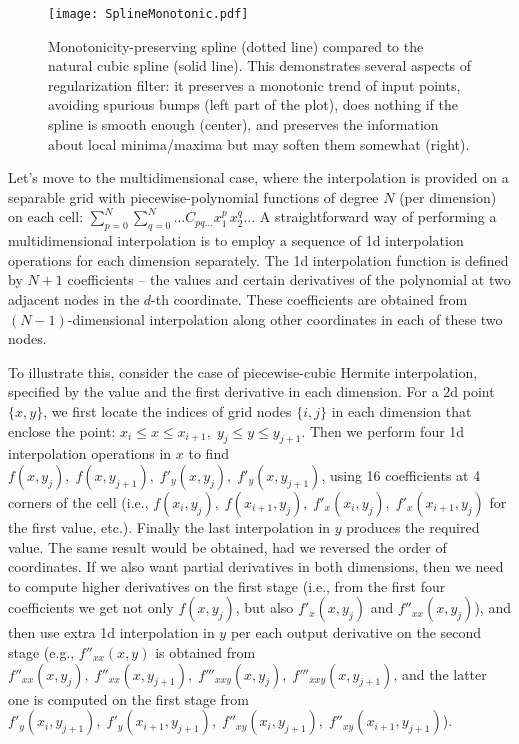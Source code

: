 \documentclass[12pt]{article}
\begin{document}
\begin{figure}[t]
\begin{center}
\texttt{[image: SplineMonotonic.pdf]}
\end{center}
\caption{Monotonicity-preserving spline (dotted line) compared to the natural cubic spline (solid line). This demonstrates several aspects of regularization filter: it preserves a monotonic trend of input points, avoiding spurious bumps (left part of the plot), does nothing if the spline is smooth enough (center), and preserves the information about local minima/maxima but may soften them somewhat (right). } \label{fig:SplineMonotonic}
\end{figure}

Let's move to the multidimensional case, where the interpolation is provided on a separable grid with piecewise-polynomial functions of degree $N$ (per dimension) on each cell: $\sum_{p=0}^{N}\sum_{q=0}^N\dots C_{pq\dots} x_1^p\,x_2^q\dots$
A straightforward way of performing a multidimensional interpolation is to employ a sequence of 1d interpolation operations for each dimension separately. The 1d interpolation function is defined by $N+1$ coefficients -- the values and certain derivatives of the polynomial at two adjacent nodes in the $d$-th coordinate. These coefficients are obtained from $(N-1)$-dimensional interpolation along other coordinates in each of these two nodes.

To illustrate this, consider the case of piecewise-cubic Hermite interpolation, specified by the value and the first derivative in each dimension. For a 2d point $\{x,y\}$, we first locate the indices of grid nodes $\{i,j\}$ in each dimension that enclose the point: $x_i\le x \le x_{i+1},\; y_j\le y \le y_{j+1}$. Then we perform four 1d interpolation operations in $x$ to find $f(x, y_j),\; f(x, y_{j+1}),\; f'_y(x, y_j),\; f'_y(x, y_{j+1})$, using 16 coefficients at 4 corners of the cell (i.e., $f(x_i,y_j),\; f(x_{i+1},y_j),\; f'_x(x_i,y_j),\; f'_x(x_{i+1},y_j)$ for the first value, etc.). Finally the last interpolation in $y$ produces the required value. The same result would be obtained, had we reversed the order of coordinates. 
If we also want partial derivatives in both dimensions, then we need to compute higher derivatives on the first stage (i.e., from the first four coefficients we get not only $f(x, y_j)$, but also $f'_x(x, y_j)$ and $f''_{xx}(x, y_j)$), and then use extra 1d interpolation in $y$ per each output derivative on the second stage (e.g., $f''_{xx}(x, y)$ is obtained from $f''_{xx}(x, y_j),\; f''_{xx}(x, y_{j+1}),\; f'''_{xxy}(x, y_j),\; f'''_{xxy}(x, y_{j+1})$, and the latter one is computed on the first stage from $f'_y(x_i, y_{j+1}),\; f'_y(x_{i+1}, y_{j+1}),\; f''_{xy}(x_i, y_{j+1}),\; f''_{xy}(x_{i+1}, y_{j+1})$). 
\end{document}
